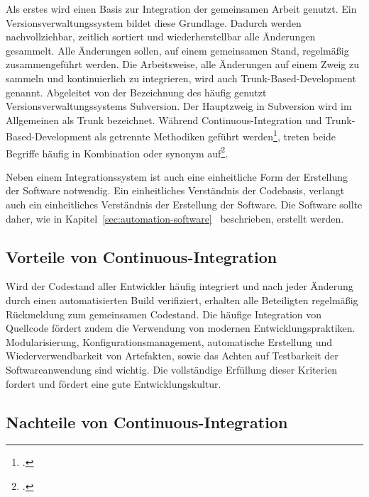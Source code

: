 Als erstes wird einen Basis zur Integration der gemeinsamen Arbeit genutzt. Ein Versionsverwaltungssystem bildet diese Grundlage. Dadurch werden nachvollziehbar, zeitlich sortiert und wiederherstellbar alle Änderungen gesammelt. Alle Änderungen sollen, auf einem gemeinsamen Stand, regelmäßig zusammengeführt werden. Die Arbeitsweise, alle Änderungen auf einem Zweig zu sammeln und kontinuierlich zu integrieren, wird auch Trunk-Based-Development genannt. Abgeleitet von der Bezeichnung des häufig genutzt Versionsverwaltungssystems Subversion. Der Hauptzweig in Subversion wird im Allgemeinen als \glqq Trunk\grqq{} bezeichnet. Während Continuous-Integration und Trunk-Based-Development als getrennte Methodiken geführt werden\footcite[vgl.][]{trunkbaseddevelopment}, treten beide Begriffe häufig in Kombination oder synonym auf\footcite[vgl.][]{fowler-feature-branch}.

Neben einem Integrationssystem ist auch eine einheitliche Form der Erstellung der Software notwendig. Ein einheitliches Verständnis der Codebasis, verlangt auch ein einheitliches Verständnis der Erstellung der Software. Die Software sollte daher, wie in Kapitel~\ref{sec:automation-software}~ beschrieben, erstellt werden.


\subsection{Vorteile von Continuous-Integration}

Wird der Codestand aller Entwickler häufig integriert und nach jeder Änderung durch einen automatisierten Build verifiziert, erhalten alle Beteiligten regelmäßig Rückmeldung zum gemeinsamen Codestand.
Die häufige Integration von Quellcode fördert zudem die Verwendung von modernen Entwicklungspraktiken. Modularisierung, Konfigurationsmanagement, automatische Erstellung und Wiederverwendbarkeit von Artefakten, sowie das Achten auf Testbarkeit der Softwareanwendung sind wichtig. Die vollständige Erfüllung dieser Kriterien fordert und fördert eine gute Entwicklungskultur.

\subsection{Nachteile von Continuous-Integration}

